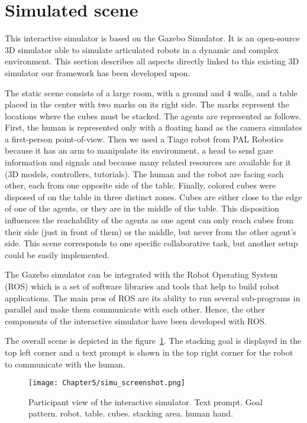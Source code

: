 \section{Simulated scene}

This interactive simulator is based on the Gazebo Simulator. It is an open-source 3D simulator able to simulate articulated robots in a dynamic and complex environment.
This section describes all aspects directly linked to this existing 3D simulator our framework has been developed upon.

The static scene consists of a large room, with a ground and 4 walls, and a table placed in the center with two marks on its right side. The marks represent the locations where the cubes must be stacked. The agents are represented as follows. First, the human is represented only with a floating hand as the camera simulates a first-person point-of-view. Then we used a Tiago robot from PAL Robotics because it has an arm to manipulate its environment, a head to send gaze information and signals and because many related resources are available for it (3D models, controllers, tutorials). The human and the robot are facing each other, each from one opposite side of the table. Finally, colored cubes were disposed of on the table in three distinct zones. Cubes are either close to the edge of one of the agents, or they are in the middle of the table. This disposition influences the reachability of the agents as one agent can only reach cubes from their side (just in front of them) or the middle, but never from the other agent's side. This scene corresponds to one specific collaborative task, but another setup could be easily implemented. 

The Gazebo simulator can be integrated with the Robot Operating System (ROS) which is a set of software libraries and tools that help to build robot applications. The main pros of ROS are its ability to run several sub-programs in parallel and make them communicate with each other. Hence, the other components of the interactive simulator have been developed with ROS.

The overall scene is depicted in the figure~\ref{fig:simu_view}. The stacking goal is displayed in the top left corner and a text prompt is shown in the top right corner for the robot to communicate with the human.

\begin{figure}[h]
    \centering
    \texttt{[image: Chapter5/simu\_screenshot.png]}
    \caption{Participant view of the interactive simulator. Text prompt. Goal pattern. robot. table. cubes. stacking area. human hand.}
    \label{fig:simu_view}
\end{figure}


